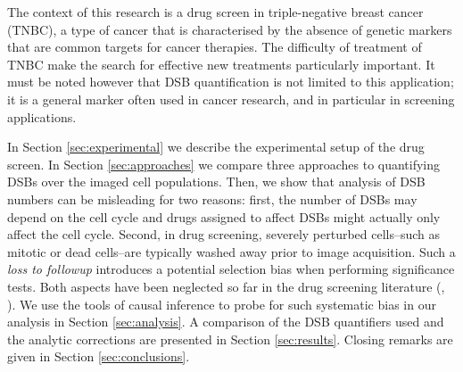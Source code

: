 The context of this research is a drug screen in triple-negative breast cancer (TNBC), a type of cancer that is characterised by the absence of genetic markers that are common targets for cancer therapies. The difficulty of treatment of TNBC make the search for effective new treatments particularly important. It must be noted however that DSB quantification is not limited to this application; it is a general marker often used in cancer research, and in particular in screening applications. 



In Section \ref{sec:experimental} we describe the experimental setup of the drug screen. In Section \ref{sec:approaches} we compare three approaches to quantifying DSBs over the imaged cell populations.
Then, we show that analysis of DSB numbers can be misleading for two reasons: first, the number of DSBs may depend on the cell cycle and drugs assigned to affect DSBs might actually only affect the cell cycle. Second, in drug screening, severely perturbed cells--such as mitotic or dead cells--are typically washed away prior to image acquisition. Such a \emph{loss to followup} introduces a potential selection bias when performing significance tests. Both aspects have been neglected so far in the drug screening literature (\cite{avondoglio2009high}, \cite{garcia2013assessment}). We use the tools of causal inference to probe for such systematic bias in our analysis in Section \ref{sec:analysis}. A comparison of the DSB quantifiers used and the analytic corrections are presented in Section \ref{sec:results}. Closing remarks are given in Section \ref{sec:conclusions}.

